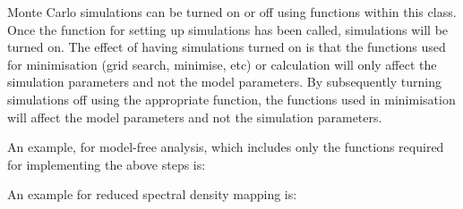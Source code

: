 Monte Carlo simulations can be turned on or off using functions within this class.  Once the
function for setting up simulations has been called, simulations will be turned on.  The
effect of having simulations turned on is that the functions used for minimisation  (grid
search, minimise,  etc) or calculation will only affect the simulation parameters and not the
model parameters.  By subsequently turning simulations off using the appropriate function,
the functions used in minimisation  will affect the model parameters and not the simulation
parameters.


An example, for model-free analysis, which includes only the functions required for
implementing the above steps is:










An example for reduced spectral density mapping  is:








